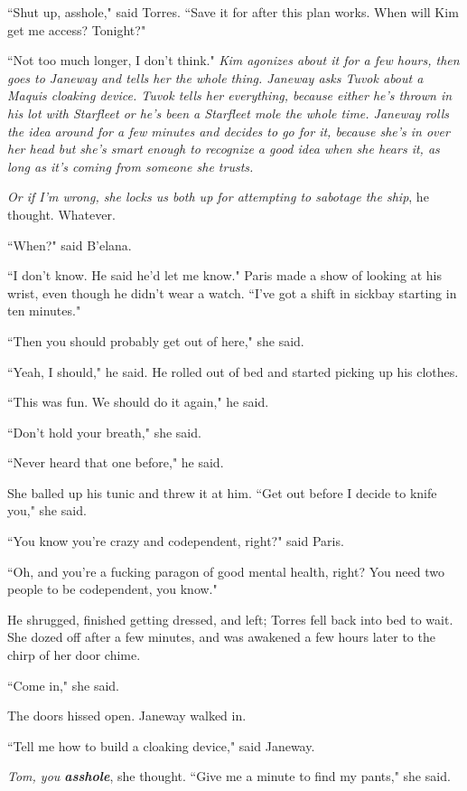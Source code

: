 \documentclass[twoside,letterpaper,12pt]{memoir}
\begin{document}
``Shut up, asshole," said Torres. ``Save it for after this plan works. When will Kim get me access? Tonight?" 

``Not too much longer, I don't think." \textit{Kim agonizes about it for a few hours, then goes to Janeway and tells her the whole thing. Janeway asks Tuvok about a Maquis cloaking device. Tuvok tells her everything, because either he's thrown in his lot with Starfleet or he's been a Starfleet mole the whole time. Janeway rolls the idea around for a few minutes and decides to go for it, because she's in over her head but she's smart enough to recognize a good idea when she hears it, as long as it's coming from someone she trusts.} 

\textit{Or if I'm wrong, she locks us both up for attempting to sabotage the ship}, he thought. Whatever. 

``When?" said B'elana. 

``I don't know. He said he'd let me know." Paris made a show of looking at his wrist, even though he didn't wear a watch. ``I've got a shift in sickbay starting in ten minutes." 

``Then you should probably get out of here," she said. 

``Yeah, I should," he said. He rolled out of bed and started picking up his clothes. 

``This was fun. We should do it again," he said. 

``Don't hold your breath," she said. 

``Never heard that one before," he said. 

She balled up his tunic and threw it at him. ``Get out before I decide to knife you," she said. 

``You know you're crazy and codependent, right?" said Paris. 

``Oh, and you're a fucking paragon of good mental health, right? You need two people to be codependent, you know." 

He shrugged, finished getting dressed, and left; Torres fell back into bed to wait. She dozed off after a few minutes, and was awakened a few hours later to the chirp of her door chime. 

``Come in," she said. 

The doors hissed open. Janeway walked in. 

``Tell me how to build a cloaking device," said Janeway. 

\textit{Tom, you \textbf{asshole}}, she thought. ``Give me a minute to find my pants," she said. 
\end{document}
